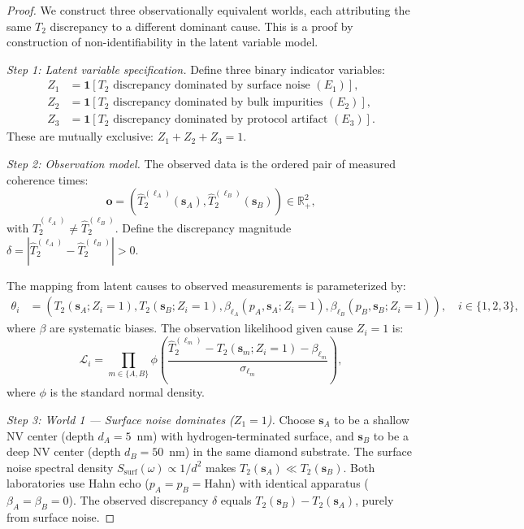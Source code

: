 \documentclass[11pt,a4paper]{article}
\theoremstyle{definition}
\newcommand{\R}{\mathbb{R}}
\newcommand{\ind}[1]{\mathbf{1}[#1]}
\newcommand{\Ttwo}{T_2}
\newcommand{\NV}{NV}
\begin{document}
\begin{proof}
We construct three observationally equivalent worlds, each attributing
the same $\Ttwo$ discrepancy to a different dominant cause. This is a
proof by construction of non-identifiability in the latent variable model.

\medskip\noindent\textit{Step 1: Latent variable specification.}
Define three binary indicator variables:
\begin{align}
    Z_1 &= \ind{\Ttwo \text{ discrepancy dominated by surface noise } (E_1)}, \\
    Z_2 &= \ind{\Ttwo \text{ discrepancy dominated by bulk impurities } (E_2)}, \\
    Z_3 &= \ind{\Ttwo \text{ discrepancy dominated by protocol artifact } (E_3)}.
\end{align}
These are mutually exclusive: $Z_1 + Z_2 + Z_3 = 1$.

\medskip\noindent\textit{Step 2: Observation model.}
The observed data is the ordered pair of measured coherence times:
\begin{equation}
    \mathbf{o} = (\widehat{T}_2^{(\ell_A)}(\mathbf{s}_A), \widehat{T}_2^{(\ell_B)}(\mathbf{s}_B)) \in \R_+^2,
\end{equation}
with $\widehat{T}_2^{(\ell_A)} \neq \widehat{T}_2^{(\ell_B)}$. Define the
discrepancy magnitude $\delta = |\widehat{T}_2^{(\ell_A)} - \widehat{T}_2^{(\ell_B)}| > 0$.

The mapping from latent causes to observed measurements is parameterized by:
\begin{align}
    \theta_i &= (\Ttwo(\mathbf{s}_A; Z_i=1), \Ttwo(\mathbf{s}_B; Z_i=1),
                 \beta_{\ell_A}(p_A, \mathbf{s}_A; Z_i=1),
                 \beta_{\ell_B}(p_B, \mathbf{s}_B; Z_i=1)), \quad i \in \{1,2,3\},
\end{align}
where $\beta$ are systematic biases. The observation likelihood given
cause $Z_i = 1$ is:
\begin{equation}
    \mathcal{L}_i = \prod_{m \in \{A,B\}} \phi\!\left(\frac{\widehat{T}_2^{(\ell_m)} - \Ttwo(\mathbf{s}_m; Z_i=1) - \beta_{\ell_m}}{\sigma_{\ell_m}}\right),
\end{equation}
where $\phi$ is the standard normal density.

\medskip\noindent\textit{Step 3: World 1 — Surface noise dominates ($Z_1 = 1$).}
Choose $\mathbf{s}_A$ to be a shallow \NV{} center (depth $d_A = 5$~nm) with
hydrogen-terminated surface, and $\mathbf{s}_B$ to be a deep \NV{} center
(depth $d_B = 50$~nm) in the same diamond substrate. The surface noise
spectral density $S_{\text{surf}}(\omega) \propto 1/d^2$ makes $\Ttwo(\mathbf{s}_A) \ll \Ttwo(\mathbf{s}_B)$.
Both laboratories use Hahn echo ($p_A = p_B = \text{Hahn}$) with identical
apparatus ($\beta_A = \beta_B = 0$). The observed discrepancy $\delta$ equals
$\Ttwo(\mathbf{s}_B) - \Ttwo(\mathbf{s}_A)$, purely from surface noise.


\end{proof}
\end{document}
